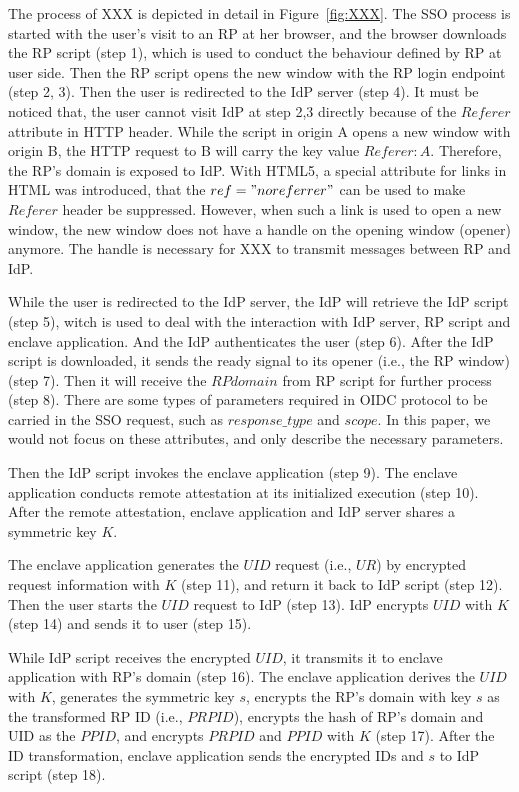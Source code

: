 The process of XXX is depicted in detail in Figure~\ref{fig:XXX}.
The SSO process is started with the user's visit to an RP at her browser, and the browser downloads the RP script (step 1), which is used to conduct the behaviour defined by RP at user side. Then the RP script opens the new window with the RP login endpoint (step 2, 3). Then the user is redirected to the IdP server (step 4). It must be noticed that, the user cannot visit IdP at step 2,3 directly because of the $Referer$ attribute in HTTP header. While the script in origin A opens a new window with origin B, the HTTP request to B will carry the key value $Referer: A$. Therefore, the RP's domain is exposed to IdP. With HTML5, a special attribute for links in HTML was introduced, that the $ref="noreferrer"$ can be used to make $Referer$ header be suppressed. However, when such a link is used to open a new window, the new window does not have a handle on the opening window (opener) anymore. The handle is necessary for XXX to transmit messages between RP and IdP.



While the user is redirected to the IdP server, the IdP will retrieve the IdP script (step 5), witch is used to deal with the interaction with IdP server, RP script and enclave application.
And the IdP authenticates the user (step 6). After the IdP script is downloaded, it sends the ready signal to its opener (i.e., the RP window) (step 7). Then it will receive the $RPdomain$ from RP script for further process (step 8). There are some types of parameters required in OIDC protocol to be carried in the SSO request, such as $response\_type$ and $scope$. In this paper, we would not focus on these attributes, and only describe the necessary parameters. 

Then the IdP script invokes the enclave application (step 9). The enclave application conducts remote attestation at its initialized execution (step 10). After the remote attestation, enclave application and IdP server shares a symmetric key $K$. 

The enclave application generates the $UID$ request (i.e., $UR$) by encrypted request information with $K$ (step 11), and return it back to IdP script (step 12). Then the user starts the $UID$ request to IdP (step 13). IdP encrypts $UID$ with $K$ (step 14) and sends it to user (step 15). 


While IdP script receives the encrypted $UID$, it transmits it to enclave application with RP's domain (step 16). The enclave application derives the $UID$ with $K$, generates the symmetric key $s$, encrypts the RP's domain with key $s$ as the transformed RP ID (i.e., $PRPID$), encrypts the hash of RP's domain and UID as the $PPID$, and encrypts $PRPID$ and $PPID$ with $K$ (step 17). After the ID transformation, enclave application sends the encrypted IDs and $s$ to IdP script (step 18).


